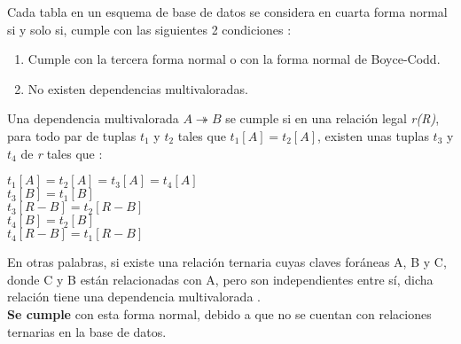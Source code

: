     Cada tabla en un esquema de base de datos se considera en cuarta forma normal si y solo si, cumple con las siguientes 2 condiciones \cite[pág. 182]{libroBaseDeDatosIngles}:
    
    \begin{enumerate}
        \item Cumple con la tercera forma normal o con la forma normal de Boyce-Codd.
        \item No existen dependencias multivaloradas.
    \end{enumerate}
    
    \noindent Una dependencia multivalorada $ A \twoheadrightarrow B$ se cumple si en una relación legal \textit{r(R)}, para todo par de tuplas $t_1$ y $t_2$    tales que $t_1[A] = t_2[A]$, existen unas tuplas $t_3$ y $t_4$ de \textit{r} tales que \cite[pág. 180]{libroBaseDeDatosEspaniol}:
    
    \begin{center}
           $t_1[A] = t_2[A] = t_3[A] = t_4[A]$\\
           $t_3[B] = t_1[B]$\\
           $t_3[R - B] = t_2[R - B]$\\
           $t_4[B] = t_2[B]$\\
           $t_4[R - B] = t_1[R - B]$
    \end{center}
    
    \noindent En otras palabras, si existe una relación ternaria cuyas claves foráneas A, B y C, donde C y B están relacionadas con A, pero son independientes entre sí, dicha relación tiene una dependencia multivalorada \cite[pág. 118]{libroBaseDeDatosInglesCuarteEnAdelante}.\\
    
    \noindent \textbf{Se cumple} con esta forma normal, debido a que no se cuentan con relaciones ternarias en la base de datos.
    
\begin{comment}
    \noindent Si se ve nuestro esquema de la base de datos, solo se cuenta con una relación que contempla 3 tablas que es \textbf{gmdl\_usuario\_logro\_curso}. Sus claves foráneas son \textbf{gmdl\_id\_curso} que hace referencia a un curso, \textbf{gmdl\_id\_logro} que hace referencia a un logro y \textbf{gmdl\_id\_usuario} que hace referencia a un usuario.\\
    
    \noindent En dicha tabla, las claves se relacionan de la siguiente manera:
    \begin{itemize}
        \item Un usuario desbloquea logros de un curso.
        \item Un curso cuenta con logros que fueron desbloqueados por usuarios.
        \item Un logro fue desbloqueado por usuarios en uno o más cursos.
    \end{itemize}
    
    \noindent \textbf{Se cumple} con la cuarta forma normal. Observando las relaciones anteriores podemos observar que no existe una dependencia multivalorada porque cada atributo se relaciona/depende de los otros 2.
\end{comment}    
    
